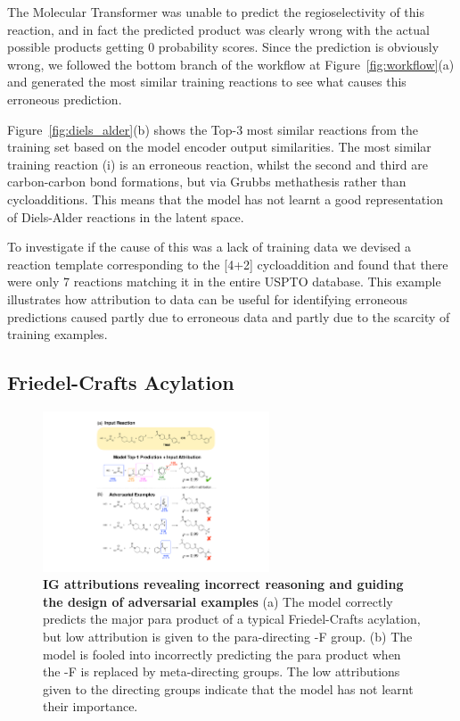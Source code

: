 The Molecular Transformer was unable to predict the regioselectivity of this reaction, and in fact the predicted product was clearly wrong with the actual possible products getting 0 probability scores. Since the prediction is obviously wrong, we followed the bottom branch of the workflow at Figure~\ref{fig:workflow}(a) and generated the most similar training reactions to see what causes this erroneous prediction.

Figure~\ref{fig:diels_alder}(b) shows the Top-3 most similar reactions from the training set based on the model encoder output similarities. The most similar training reaction (i) is an erroneous reaction, whilst the second and third are carbon-carbon bond formations, but via Grubbs methathesis \cite{grubbs} rather than cycloadditions. This means that the model has not learnt a good representation of Diels-Alder reactions in the latent space. 

To investigate if the cause of this was a lack of training data we devised a reaction template corresponding to the [4+2] cycloaddition and found that there were only 7 reactions matching it in the entire USPTO database. This example illustrates how attribution to data can be useful for identifying erroneous predictions caused partly due to erroneous data and partly due to the scarcity of training examples. 

\subsection*{Friedel-Crafts Acylation}

\begin{figure}[ht!]
    \centering
    \includegraphics[width=0.6\textwidth]{Chapters/Transformer/Figs/sear.pdf}
    \caption{\label{fig:sear} \textbf{IG attributions revealing incorrect reasoning and guiding the design of adversarial examples} (a) The model correctly predicts the major para product of a typical Friedel-Crafts acylation, but low attribution is given to the para-directing -F group. (b) The model is fooled into incorrectly predicting the para product when the -F is replaced by meta-directing groups. The low attributions given to the directing groups indicate that the model has not learnt their importance.}
\end{figure}

